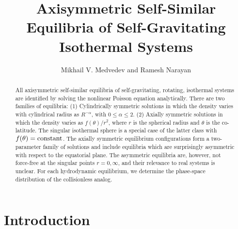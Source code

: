 \newcommand{\beq}{\begin{equation}}
\newcommand{\eeq}{\end{equation}}
\newcommand{\bea}{\begin{eqnarray}}
\newcommand{\eea}{\end{eqnarray}}
\newcommand{\bml}{\begin{mathletters}}
\newcommand{\eml}{\end{mathletters}}
\newcommand{\pd}[3]{\frac{\partial^{#3}{#1}}{\partial {#2}^{#3}}}
\newcommand{\td}[3]{\frac{d^{#3}{#1}}{d{#2}^{#3}}}
\newcommand{\rem}[1]{ }

\title{Axisymmetric Self-Similar Equilibria of Self-Gravitating Isothermal 
Systems}
\author{Mikhail V. Medvedev and Ramesh Narayan }


\begin{abstract}
All axisymmetric self-similar equilibria of self-gravitating, 
rotating, isothermal systems are identified by solving the nonlinear Poisson 
equation analytically. There are two families of equilibria: 
(1) Cylindrically symmetric solutions in which the density varies with
cylindrical radius as $R^{-\alpha}$, with $0\le\alpha\le2$.
(2) Axially symmetric solutions in which the density varies as
$f(\theta)/r^2$, where $r$ is the spherical radius and $\theta$ is the
co-latitude. The singular isothermal sphere is a special case of the latter
class with $f(\theta)={\rm constant}$. The axially symmetric equilibrium 
configurations form a two-parameter family of solutions and include 
equilibria which are surprisingly asymmetric with respect to the equatorial 
plane. The asymmetric equilibria are, however, not force-free at the singular 
points $r=0, \infty$, and their relevance to real systems is unclear. 
For each hydrodynamic equilibrium, we determine the 
phase-space distribution of the collisionless analog.
\end{abstract}


\section{Introduction}

